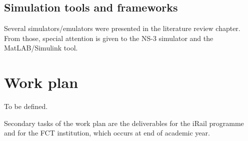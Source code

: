 \subsection{Simulation tools and frameworks}

Several simulators/emulators were presented in the literature review chapter. From those, special attention is given to the NS-3 simulator and the MatLAB/Simulink tool.  

\section{Work plan}
\label{sec:44}

To be defined.

Secondary tasks of the work plan are the deliverables for the iRail programme and for the FCT institution, which occurs at end of academic year. 


